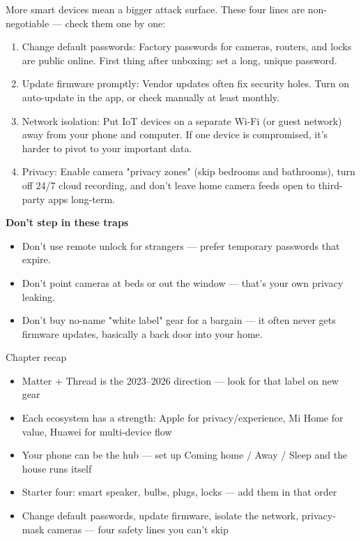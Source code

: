 
More smart devices mean a bigger attack surface. These four lines are non-negotiable — check them one by one:

\begin{enumerate}
  \item Change default passwords: Factory passwords for cameras, routers, and locks are public online. First thing after unboxing: set a long, unique password.
  \item Update firmware promptly: Vendor updates often fix security holes. Turn on auto-update in the app, or check manually at least monthly.
  \item Network isolation: Put IoT devices on a separate Wi-Fi (or guest network) away from your phone and computer. If one device is compromised, it's harder to pivot to your important data.
  \item Privacy: Enable camera "privacy zones" (skip bedrooms and bathrooms), turn off 24/7 cloud recording, and don't leave home camera feeds open to third-party apps long-term.
\end{enumerate}

\textbf{Don't step in these traps}\par

\begin{itemize}
  \item Don't use remote unlock for strangers — prefer temporary passwords that expire.
  \item Don't point cameras at beds or out the window — that's your own privacy leaking.
  \item Don't buy no-name "white label" gear for a bargain — it often never gets firmware updates, basically a back door into your home.
\end{itemize}

\begin{tcbsummary}{Chapter recap}
\begin{itemize}
  \item Matter + Thread is the 2023–2026 direction — look for that label on new gear
  \item Each ecosystem has a strength: Apple for privacy/experience, Mi Home for value, Huawei for multi-device flow
  \item Your phone can be the hub — set up Coming home / Away / Sleep and the house runs itself
  \item Starter four: smart speaker, bulbs, plugs, locks — add them in that order
  \item Change default passwords, update firmware, isolate the network, privacy-mask cameras — four safety lines you can't skip
\end{itemize}

\end{tcbsummary}
